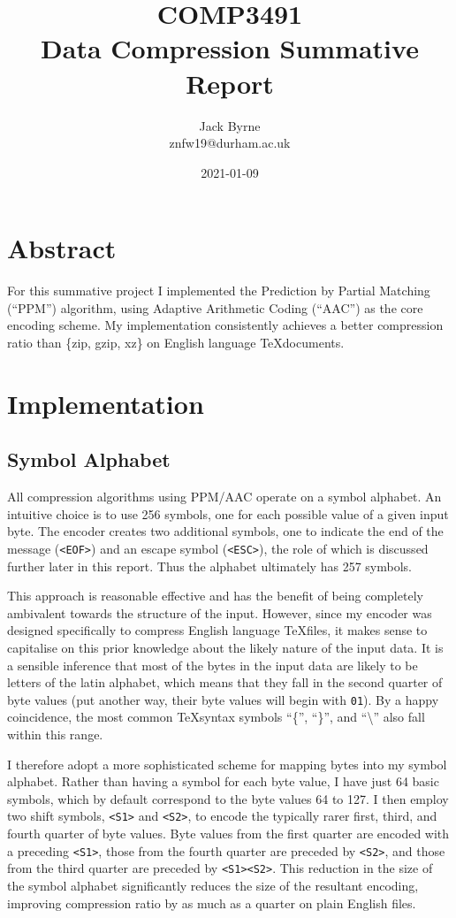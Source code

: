 \documentclass[11pt]{article}
\title{COMP3491 \\ Data Compression Summative Report}
\date{2021-01-09}
\author{Jack Byrne \\ znfw19@durham.ac.uk}
\newcommand{\code}[1]{\texttt{#1}}
\begin{document}
\maketitle

\section{Abstract}

For this summative project I implemented the Prediction by Partial Matching (\enquote{PPM}) algorithm, using Adaptive Arithmetic Coding (\enquote{AAC}) as the core encoding scheme. My implementation consistently achieves a better compression ratio than \{zip, gzip, xz\} on English language \TeX  \thinspace documents.

\section{Implementation}

\subsection{Symbol Alphabet}

All compression algorithms using PPM/AAC operate on a symbol alphabet. An intuitive choice is to use 256 symbols, one for each possible value of a given input byte. The encoder creates two additional symbols, one to indicate the end of the message (\code{<EOF>}) and an escape symbol (\code{<ESC>}), the role of which is discussed further later in this report. Thus the alphabet ultimately has 257 symbols.

This approach is reasonable effective and has the benefit of being completely ambivalent towards the structure of the input. However, since my encoder was designed specifically to compress English language \TeX \thinspace files, it makes sense to capitalise on this prior knowledge about the likely nature of the input data. It is a sensible inference that most of the bytes in the input data are likely to be letters of the latin alphabet, which means that they fall in the second quarter of byte values (put another way, their byte values will begin with \code{01}). By a happy coincidence, the most common \TeX \thinspace syntax symbols \enquote{\{}, \enquote{\}}, and \enquote{\textbackslash} also fall within this range.

I therefore adopt a more sophisticated scheme for mapping bytes into my symbol alphabet. Rather than having a symbol for each byte value, I have just 64 basic symbols, which by default correspond to the byte values 64 to 127. I then employ two shift symbols, \code{<S1>} and \code{<S2>}, to encode the typically rarer first, third, and fourth quarter of byte values. Byte values from the first quarter are encoded with a preceding \code{<S1>}, those from the fourth quarter are preceded by \code{<S2>}, and those from the third quarter are preceded by \code{<S1><S2>}. This reduction in the size of the symbol alphabet significantly reduces the size of the resultant encoding, improving compression ratio by as much as a quarter on plain English files.
\end{document}
